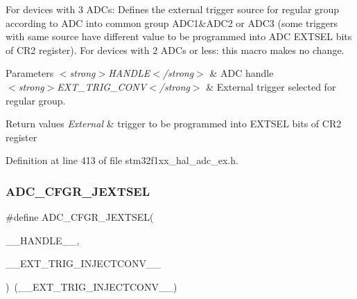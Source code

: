 For devices with 3 A\+D\+Cs\+: Defines the external trigger source for regular group according to A\+DC into common group A\+D\+C1\&A\+D\+C2 or A\+D\+C3 (some triggers with same source have different value to be programmed into A\+DC E\+X\+T\+S\+EL bits of C\+R2 register). For devices with 2 A\+D\+Cs or less\+: this macro makes no change. 


\begin{DoxyParams}{Parameters}
{\em $<$strong$>$\+H\+A\+N\+D\+L\+E$<$/strong$>$} & A\+DC handle \\
\hline
{\em $<$strong$>$\+E\+X\+T\+\_\+\+T\+R\+I\+G\+\_\+\+C\+O\+N\+V$<$/strong$>$} & External trigger selected for regular group. \\
\hline
\end{DoxyParams}

\begin{DoxyRetVals}{Return values}
{\em External} & trigger to be programmed into E\+X\+T\+S\+EL bits of C\+R2 register \\
\hline
\end{DoxyRetVals}


Definition at line 413 of file stm32f1xx\+\_\+hal\+\_\+adc\+\_\+ex.\+h.

\mbox{\label{group___a_d_c_ex___private___macro_gafe312b4271f46a1a24243e3021dc9e2a}} 
\subsubsection{\texorpdfstring{A\+D\+C\+\_\+\+C\+F\+G\+R\+\_\+\+J\+E\+X\+T\+S\+EL}{ADC\_CFGR\_JEXTSEL}}
{\footnotesize\ttfamily \#define A\+D\+C\+\_\+\+C\+F\+G\+R\+\_\+\+J\+E\+X\+T\+S\+EL(\begin{DoxyParamCaption}\item[{}]{\+\_\+\+\_\+\+H\+A\+N\+D\+L\+E\+\_\+\+\_\+,  }\item[{}]{\+\_\+\+\_\+\+E\+X\+T\+\_\+\+T\+R\+I\+G\+\_\+\+I\+N\+J\+E\+C\+T\+C\+O\+N\+V\+\_\+\+\_\+ }\end{DoxyParamCaption})~(\+\_\+\+\_\+\+E\+X\+T\+\_\+\+T\+R\+I\+G\+\_\+\+I\+N\+J\+E\+C\+T\+C\+O\+N\+V\+\_\+\+\_\+)}



